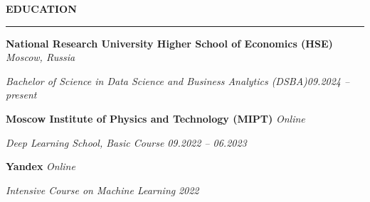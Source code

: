 \documentclass[10pt,a4paper]{article}
\newcommand{\sechead}[1]{%
  \noindent\textbf{#1}\par
  \vspace{-8pt}
  \noindent\rule{\linewidth}{0.4pt}\par\vspace{0.1cm}
}
\begin{document}
\sechead{EDUCATION}

\textbf{National Research University Higher School of Economics (HSE)} \hfill \emph{Moscow, Russia}

	\textit{Bachelor of Science in Data Science and Business Analytics (DSBA)}\hfill \emph{09.2024 – present}\vspace{0.2cm}
	
	\textbf{Moscow Institute of Physics and Technology (MIPT)} \hfill \emph{Online}
	
\textit{Deep Learning School, Basic Course} \hfill \emph{09.2022 – 06.2023}\vspace{0.2cm}

\textbf{Yandex} \hfill \emph{Online}

\textit{Intensive Course on Machine Learning} \hfill \emph{2022}
\end{document}
